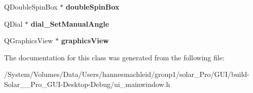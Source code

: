 \begin{DoxyCompactItemize}
Q\+Double\+Spin\+Box $\ast$ {\bfseries double\+Spin\+Box}
\item 
\mbox{\label{class_ui___main_window_a8de860b557db1570d1e044a8b531e031}} 
Q\+Dial $\ast$ {\bfseries dial\+\_\+\+Set\+Manual\+Angle}
\item 
\mbox{\label{class_ui___main_window_ab1813622ffcc96b61af82cdc814ec693}} 
Q\+Graphics\+View $\ast$ {\bfseries graphics\+View}
\end{DoxyCompactItemize}


The documentation for this class was generated from the following file\+:\begin{DoxyCompactItemize}
\item 
/\+System/\+Volumes/\+Data/\+Users/hannesmachleid/group1/solar\+\_\+\+Pro/\+G\+U\+I/build-\/\+Solar\+\_\+\+\_\+\+Pro\+\_\+\+G\+U\+I-\/\+Desktop-\/\+Debug/ui\+\_\+mainwindow.\+h\end{DoxyCompactItemize}
